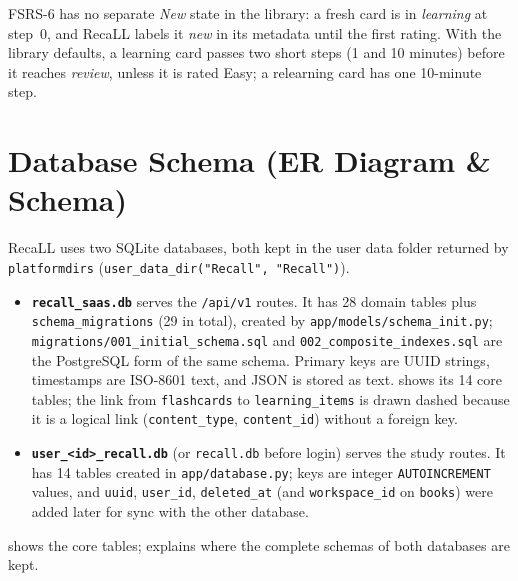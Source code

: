 FSRS-6 has no separate \emph{New} state in the library: a fresh card is in
\emph{learning} at step~0, and RecaLL labels it \emph{new} in its metadata until the
first rating. With the library defaults, a learning card passes two short steps (1 and
10 minutes) before it reaches \emph{review}, unless it is rated Easy; a relearning card
has one 10-minute step.



\section{Database Schema (ER Diagram \& Schema)}\label{sec:db}

RecaLL uses two SQLite databases, both kept in the user data folder returned by
\texttt{platformdirs} (\texttt{user\_data\_dir("Recall", "Recall")}).

\begin{itemize}[leftmargin=*]
  \item \textbf{\texttt{recall\_saas.db}} serves the \texttt{/api/v1} routes. It has 28
    domain tables plus \texttt{schema\_migrations} (29 in total), created by
    \texttt{app/models/schema\_init.py}; \texttt{migrations/001\_initial\_schema.sql} and
    \texttt{002\_composite\_indexes.sql} are the PostgreSQL form of the same schema.
    Primary keys are UUID strings, timestamps are ISO-8601 text, and JSON is stored as
    text.  shows its 14 core tables; the link from \texttt{flashcards} to
    \texttt{learning\_items} is drawn dashed because it is a logical link
    (\texttt{content\_type}, \texttt{content\_id}) without a foreign key.
  \item \textbf{\texttt{user\_<id>\_recall.db}} (or \texttt{recall.db} before login) serves
    the study routes. It has 14 tables created in \texttt{app/database.py}; keys are
    integer \texttt{AUTOINCREMENT} values, and \texttt{uuid}, \texttt{user\_id},
    \texttt{deleted\_at} (and \texttt{workspace\_id} on \texttt{books}) were added later
    for sync with the other database.
\end{itemize}

 shows the core tables;  explains where the complete
schemas of both databases are kept.

